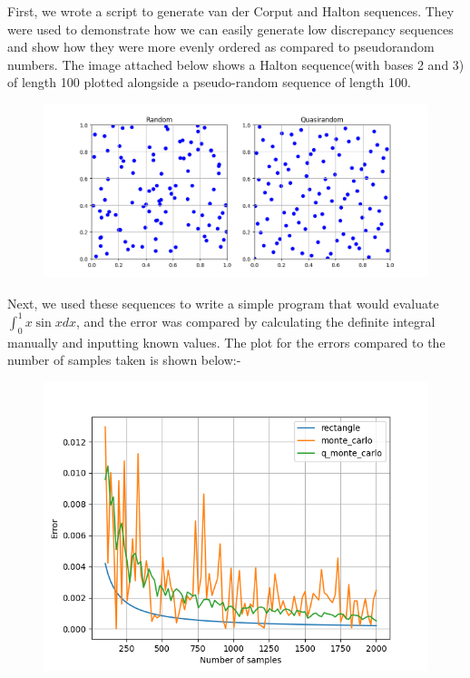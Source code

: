 \documentclass[12pt,letterpaper, twoside]{article}
\theoremstyle{definition}
\begin{document}
\newpage

First, we wrote a script to generate van der Corput and Halton sequences. They were used to demonstrate how we can easily generate low discrepancy sequences and show how they were more evenly ordered as compared to pseudorandom numbers. The image attached below shows a Halton sequence(with bases 2 and 3) of length 100 plotted alongside a pseudo-random sequence of length 100.

\begin{figure}[h]
\includegraphics[width=12cm]{images/halton_sequence.png}
\centering
 \end{figure}

Next, we used these sequences to write a simple program that would evaluate $\int_{0}^{1}x \sin{x}dx$, and the error was compared by calculating the definite integral manually and inputting known values. The plot for the errors compared to the number of samples taken is shown below:-

\begin{figure}[h]
\includegraphics[width=12cm]{images/xsinx.png}
\centering
 \end{figure}
\end{document}
